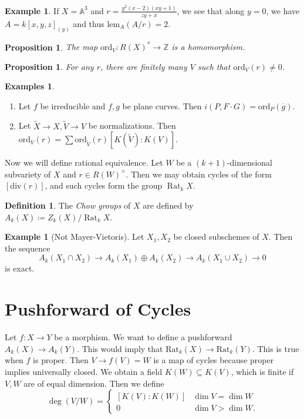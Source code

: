\documentclass[leqno, openany]{memoir}
\newtheorem{prop}[thm]{Proposition}
\theoremstyle{definition}
\newtheorem{defn}[thm]{Definition}
\newtheorem{exm}[thm]{Example}
\newtheorem{exms}[thm]{Examples}
\theoremstyle{remark}
\theoremstyle{plain}
\theoremstyle{definition}
\theoremstyle{remark}
\newcommand{\A}{\mathbb{A}}
\newcommand{\Z}{\mathbb{Z}}
\newcommand{\mr}[1]{\mathrm{#1}}
\newcommand{\ol}[1]{\overline{#1}}
\newcommand{\wt}[1]{\widetilde{#1}}
\begin{document}
\begin{exm}
    If $X = \A^3$ and $r = \frac{y^2(x-2)(xy+1)}{zy+x}$, we see that along $y = 0$, we have $A = { k[x,y,z] }_{(y)}$ and thus $\mr{lem}_A(A/r) = 2$.
\end{exm}

\begin{prop}
    The map $\mr{ord}_V \colon R(X)^* \to \Z$ is a homomorphism.
\end{prop}

\begin{prop}
    For any $r$, there are finitely many $V$ such that $\mr{ord}_V(r) \neq 0$.
\end{prop}

\begin{exms}\leavevmode
    \begin{enumerate}
        \item Let $f$ be irreducible and $f,g$ be plane curves. Then $i(P, F \cdot G) = \mr{ord}_P(\ol{g})$.
        \item Let $\wt{X} \to X, \wt{V} \to V$ be normalizations. Then $\mr{ord}_V(r) = \sum \mr{ord}_{\wt{V}}(r) [K(\wt{V}) : K(V)]$.
    \end{enumerate}
\end{exms}

Now we will define rational equivalence. Let $W$ be a $(k+1)$-dimensional subvariety of $X$ and $r \in { R(W) }^{\times}$. Then we may obtain cycles of the form $[\mr{div}(r)]$, and such cycles form the group $\operatorname{Rat}_k X$.

\begin{defn}
    The \textit{Chow groups} of $X$ are defined by $A_k(X) \coloneqq Z_k(X) / \operatorname{Rat}_k X$. 
\end{defn}

\begin{exm}[Not Mayer-Vietoris]
    Let $X_1, X_2$ be closed subschemes of $X$. Then the sequence
    \[ A_k(X_1 \cap X_2) \to A_k(X_1) \oplus A_k(X_2) \to A_k(X_1 \cup X_2) \to 0 \]
    is exact.
\end{exm}

\section{Pushforward of Cycles}%
\label{sec:pushforward_of_cycles}

Let $f \colon X \to Y$ be a morphism. We want to define a pushforward $A_k(X) \to A_k(Y)$. This would imply that $\mr{Rat}_k(X) \to \mr{Rat}_k(Y)$. This is true when $f$ is proper. Then $V \to f(V) = W$ is a map of cycles because proper implies universally closed. We obtain a field $K(W) \subseteq K(V)$, which is finite if $V,W$ are of equal dimension. Then we define
\[ \deg(V/W) = \begin{cases}
    [K(V) : K(W)] & \dim V = \dim W \\
    0 & \dim V > \dim W.
\end{cases} \]
\end{document}
